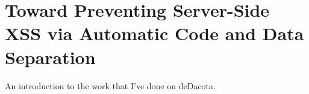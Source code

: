 \chapter[Toward Preventing Server-Side XSS]{Toward Preventing Server-Side XSS via Automatic Code and Data Separation}
\label{dedacota}

An introduction to the work that I've done on deDacota.

